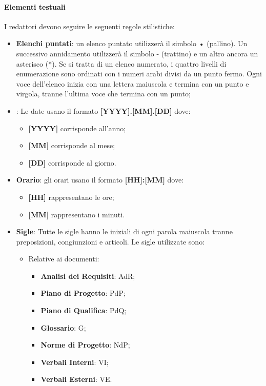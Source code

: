 \paragraph{Elementi testuali}
I redattori devono seguire le seguenti regole stilistiche:
\begin{itemize}
\item \textbf{Elenchi puntati}: un elenco puntato utilizzerà il simbolo • (pallino). Un successivo annidamento utilizzerà il simbolo - (trattino) e un altro ancora un asterisco (*). Se si tratta di un elenco numerato, i quattro livelli di enumerazione sono ordinati con i numeri arabi divisi da un punto fermo. Ogni voce dell’elenco inizia con una lettera maiuscola e termina con un punto e virgola, tranne l'ultima voce che termina con un punto;

\item {}: Le date usano il formato \textbf{[YYYY].[MM].[DD]} dove:
    \begin{itemize}
    \item \textbf{[YYYY]} corrisponde all’anno;
    \item \textbf{[MM]} corrisponde al mese;
    \item \textbf{[DD]} corrisponde al giorno.
    \end{itemize}

\item \textbf{Orario}: gli orari usano il formato \textbf{[HH]:[MM]} dove:
    \begin{itemize}
    \item \textbf{[HH]} rappresentano le ore;
    \item \textbf{[MM]} rappresentano i minuti.
    \end{itemize}

\item \textbf{Sigle}: Tutte le sigle hanno le iniziali di ogni parola maiuscola tranne preposizioni, congiunzioni e articoli. Le sigle utilizzate sono:
    \begin{itemize}
    \item Relative ai documenti:
        \begin{itemize}
        \item \textbf{Analisi dei Requisiti}: AdR;
        \item \textbf{Piano di Progetto}: PdP;
        \item \textbf{Piano di Qualifica}: PdQ;
        \item \textbf{Glossario}: G;
        \item \textbf{Norme di Progetto}: NdP;
        \item \textbf{Verbali Interni}: VI;
        \item \textbf{Verbali Esterni}: VE.
        \end{itemize}
    

\end{itemize}
\end{itemize}

